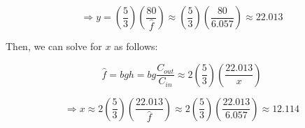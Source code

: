\documentclass[fleqn]{article}
\begin{document}
\begin{enumerate}
\begin{enumerate}
				\begin{equation*}
					 \Rightarrow y = \left(\frac{5}{3}\right)\left(\frac{80}{\hat{f}}\right) \approx \left(\frac{5}{3}\right)\left(\frac{80}{6.057}\right) \approx \mathbf{22.013}
				\end{equation*}
				
				Then, we can solve for $x$ as follows:
				
				\begin{equation*}
					\hat{f} = bgh = bg\frac{C_{out}}{C_{in}} \approx 2\left(\frac{5}{3}\right)\left(\frac{22.013}{x}\right)
				\end{equation*}
				
				\begin{equation*}
					 \Rightarrow x \approx 2\left(\frac{5}{3}\right)\left(\frac{22.013}{\hat{f}}\right) \approx 2\left(\frac{5}{3}\right)\left(\frac{22.013}{6.057}\right) \approx \mathbf{12.114}
				\end{equation*}
			
			\end{enumerate}
	\end{enumerate}
\end{document}

